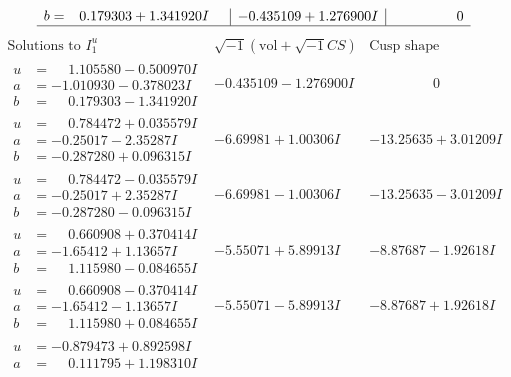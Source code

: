 \documentclass[1p]{elsarticle_modified}
\theoremstyle{definition}
\newcommand{\I}{\sqrt{-1}}
\begin{document}
$$\begin{array}{c|c|c}
\begin{aligned}
b &= \phantom{-}0.179303 + 1.341920 I\end{aligned}
 & -0.435109 + 1.276900 I & \phantom{-0.000000 } 0\\
 \hline 
 \end{array}$$\newpage$$\begin{array}{c|c|c}  
\text{Solutions to }I^u_{1}& \I (\text{vol} + \sqrt{-1}CS) & \text{Cusp shape}\\
 \hline 
\begin{aligned}
u &= \phantom{-}1.105580 - 0.500970 I \\
a &= -1.010930 - 0.378023 I \\
b &= \phantom{-}0.179303 - 1.341920 I\end{aligned}
 & -0.435109 - 1.276900 I & \phantom{-0.000000 } 0 \\ \hline\begin{aligned}
u &= \phantom{-}0.784472 + 0.035579 I \\
a &= -0.25017 - 2.35287 I \\
b &= -0.287280 + 0.096315 I\end{aligned}
 & -6.69981 + 1.00306 I & -13.25635 + 3.01209 I \\ \hline\begin{aligned}
u &= \phantom{-}0.784472 - 0.035579 I \\
a &= -0.25017 + 2.35287 I \\
b &= -0.287280 - 0.096315 I\end{aligned}
 & -6.69981 - 1.00306 I & -13.25635 - 3.01209 I \\ \hline\begin{aligned}
u &= \phantom{-}0.660908 + 0.370414 I \\
a &= -1.65412 + 1.13657 I \\
b &= \phantom{-}1.115980 - 0.084655 I\end{aligned}
 & -5.55071 + 5.89913 I & -8.87687 - 1.92618 I \\ \hline\begin{aligned}
u &= \phantom{-}0.660908 - 0.370414 I \\
a &= -1.65412 - 1.13657 I \\
b &= \phantom{-}1.115980 + 0.084655 I\end{aligned}
 & -5.55071 - 5.89913 I & -8.87687 + 1.92618 I \\ \hline\begin{aligned}
u &= -0.879473 + 0.892598 I \\
a &= \phantom{-}0.111795 + 1.198310 I \\

\end{aligned}
\end{array}$$
\end{document}
